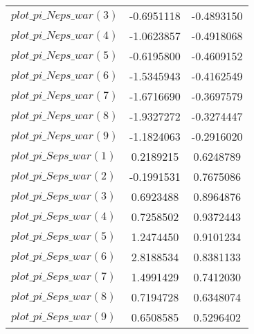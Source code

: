 \begin{center}
\begin{longtable}{lcc}
$plot\_pi\_N eps\_war (3)   $	 & 	     -0.6951118	 & 	     -0.4893150 \\ 
$plot\_pi\_N eps\_war (4)   $	 & 	     -1.0623857	 & 	     -0.4918068 \\ 
$plot\_pi\_N eps\_war (5)   $	 & 	     -0.6195800	 & 	     -0.4609152 \\ 
$plot\_pi\_N eps\_war (6)   $	 & 	     -1.5345943	 & 	     -0.4162549 \\ 
$plot\_pi\_N eps\_war (7)   $	 & 	     -1.6716690	 & 	     -0.3697579 \\ 
$plot\_pi\_N eps\_war (8)   $	 & 	     -1.9327272	 & 	     -0.3274447 \\ 
$plot\_pi\_N eps\_war (9)   $	 & 	     -1.1824063	 & 	     -0.2916020 \\ 
$plot\_pi\_S eps\_war (1)   $	 & 	      0.2189215	 & 	      0.6248789 \\ 
$plot\_pi\_S eps\_war (2)   $	 & 	     -0.1991531	 & 	      0.7675086 \\ 
$plot\_pi\_S eps\_war (3)   $	 & 	      0.6923488	 & 	      0.8964876 \\ 
$plot\_pi\_S eps\_war (4)   $	 & 	      0.7258502	 & 	      0.9372443 \\ 
$plot\_pi\_S eps\_war (5)   $	 & 	      1.2474450	 & 	      0.9101234 \\ 
$plot\_pi\_S eps\_war (6)   $	 & 	      2.8188534	 & 	      0.8381133 \\ 
$plot\_pi\_S eps\_war (7)   $	 & 	      1.4991429	 & 	      0.7412030 \\ 
$plot\_pi\_S eps\_war (8)   $	 & 	      0.7194728	 & 	      0.6348074 \\ 
$plot\_pi\_S eps\_war (9)   $	 & 	      0.6508585	 & 	      0.5296402 \\ 
\end{longtable}
 \end{center}
